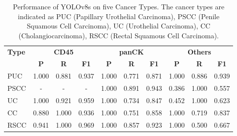 \documentclass{midl} %
\begin{document}
\begin{table}[!htbp]
\setlength{\abovecaptionskip}{2pt} 
\centering
\caption{Performance of YOLOv8s on five Cancer Types. The cancer types are indicated as PUC (Papillary Urothelial Carcinoma), PSCC (Penile Squamous Cell Carcinoma), UC (Urothelial Carcinoma), CC (Cholangiocarcinoma), RSCC (Rectal Squamous Cell Carcinoma).}%
  \begin{tabular}{l|ccc|ccc|ccc}
  \toprule
  \bfseries Type & \multicolumn{3}{c|}{\bfseries CD45} & \multicolumn{3}{c|}{\bfseries panCK} & \multicolumn{3}{c}{\bfseries Others}\\
  & \bfseries P & \bfseries R & \bfseries F1 & \bfseries P & \bfseries R & \bfseries F1 & \bfseries P & \bfseries R & \bfseries F1\\
  PUC & 1.000 & 0.881 & 0.937 & 1.000 & 0.771 & 0.871 & 1.000 & 0.886 & 0.939\\
  PSCC & - & - & - & 1.000 & 0.891 & 0.943 & 0.386 & 1.000 & 0.557\\
  UC & 1.000 & 0.921 & 0.959 & 1.000 & 0.734 & 0.847 & 0.452 & 1.000 & 0.623\\
  CC & 0.880 & 1.000 & 0.936 & 1.000 & 0.751 & 0.858 & 1.000 & 0.719 & 0.837\\
  RSCC & 0.941 & 1.000 & 0.969 & 1.000 & 0.857 & 0.923 & 1.000 & 0.500 & 0.667\\
  \bottomrule
  \end{tabular}
  \label{tab:cancer_validation}
\end{table}
\vspace{-1em}
\end{document}

